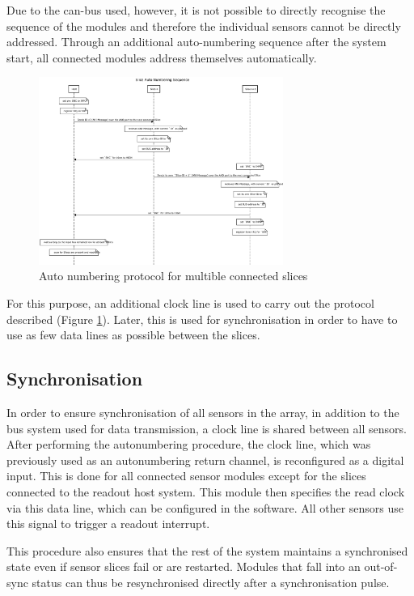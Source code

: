 \documentclass[conference]{IEEEtran}
\begin{document}
Due to the can-bus used, however, it is not possible to directly recognise the sequence of the modules and therefore the individual sensors cannot be directly addressed.
Through an additional auto-numbering sequence after the system start, all connected modules address themselves automatically.

\begin{figure}[htbp]
\centerline{\includegraphics[width=8cm]{anp.png}}
\caption{Auto numbering protocol for multible connected slices}
\label{anp_fig}
\end{figure}

For this purpose, an additional clock line is used to carry out the protocol described (Figure \ref{anp_fig}). Later, this is used for synchronisation in order to have to use as few data lines as possible between the slices.

    


\subsection{Synchronisation}

In order to ensure synchronisation of all sensors in the array, in addition to the bus system used for data transmission, a clock line is shared between all sensors.
After performing the autonumbering procedure, the clock line, which was previously used as an autonumbering return channel, is reconfigured as a digital input.
This is done for all connected sensor modules except for the slices connected to the readout host system.
This module then specifies the read clock via this data line, which can be configured in the software.
All other sensors use this signal to trigger a readout interrupt.

This procedure also ensures that the rest of the system maintains a synchronised state even if sensor slices fail or are restarted.
Modules that fall into an out-of-sync status can thus be resynchronised directly after a synchronisation pulse.
\end{document}
